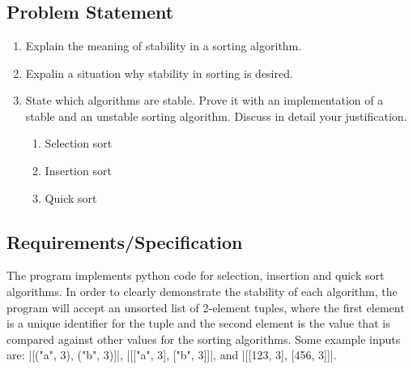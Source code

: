 \documentclass{report}
\begin{document}
\chapter{}
\section{Problem Statement}
\begin{enumerate}[label=(\alph*)]
	\item Explain the meaning of stability in a sorting algorithm.
	\item Expalin a situation why stability in sorting is desired.
	\item State which algorithms are stable. Prove it with an implementation of a stable and an unstable sorting algorithm. Discuss in detail your justification.
	\begin{enumerate}[label=\roman*.]
		\item Selection sort
		\item Insertion sort
		\item Quick sort
	\end{enumerate}
\end{enumerate}
\section{Requirements/Specification}
The program implements python code for selection, insertion and quick sort algorithms. In order to clearly demonstrate the stability of each algorithm, the program will accept an unsorted list of 2-element tuples, where the first element is a unique identifier for the tuple and the second element is the value that is compared against other values for the sorting algorithms. Some example inputs are: |[("a", 3), ("b", 3)]|, |[["a", 3], ["b", 3]]|, and |[[123, 3], [456, 3]]|.
\end{document}
